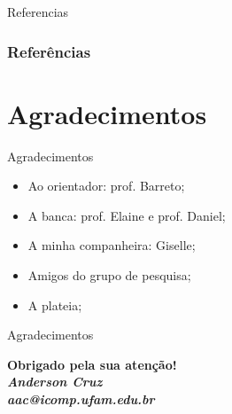 \documentclass{beamer}
\begin{document}
\begin{frame}{Referencias}
\frametitle{Referências}
    \tiny{ }
    
\end{frame}


\section{Agradecimentos}
\begin{frame}{Agradecimentos}
\begin{itemize}
 \item Ao orientador: prof. Barreto; 
\item A banca: prof. Elaine e prof. Daniel;
\item A minha companheira: Giselle;
\item Amigos do grupo de pesquisa;
\item A plateia;
\end{itemize}

\end{frame}

  \begin{frame}{Agradecimentos}
  \begin{center}
 
  \textcolor{VerdeUFAM}{\Large \textbf{Obrigado pela sua atenção!}} \\
  \vspace*{20px}
  \textit{\textbf{Anderson Cruz}} \\
  \textit{\textbf{aac@icomp.ufam.edu.br}}
 
  \end{center}
  \end{frame}

 
 
\end{document}
